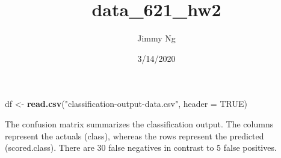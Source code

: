 \documentclass[
]{article}
\title{data\_621\_hw2}
\author{Jimmy Ng}
\date{3/14/2020}
\newenvironment{Shaded}{\begin{snugshade}}{\end{snugshade}}
\newcommand{\CommentTok}[1]{\textcolor[rgb]{0.56,0.35,0.01}{\textit{#1}}}
\newcommand{\DataTypeTok}[1]{\textcolor[rgb]{0.13,0.29,0.53}{#1}}
\newcommand{\KeywordTok}[1]{\textcolor[rgb]{0.13,0.29,0.53}{\textbf{#1}}}
\newcommand{\NormalTok}[1]{#1}
\newcommand{\OperatorTok}[1]{\textcolor[rgb]{0.81,0.36,0.00}{\textbf{#1}}}
\newcommand{\OtherTok}[1]{\textcolor[rgb]{0.56,0.35,0.01}{#1}}
\newcommand{\StringTok}[1]{\textcolor[rgb]{0.31,0.60,0.02}{#1}}
\begin{document}
\maketitle

\begin{Shaded}
\begin{Highlighting}[]
\NormalTok{df <-}\StringTok{ }\KeywordTok{read.csv}\NormalTok{(}\StringTok{"classification-output-data.csv"}\NormalTok{, }\DataTypeTok{header =} \OtherTok{TRUE}\NormalTok{)}
\end{Highlighting}
\end{Shaded}

\begin{Shaded}
\end{Shaded}

The confusion matrix summarizes the classification output. The columns
represent the actuals (class), whereas the rows represent the predicted
(scored.class). There are 30 false negatives in contrast to 5 false
positives.
\end{document}
